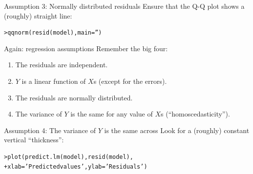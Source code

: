 \documentclass{beamer}\usepackage[]{graphicx}\usepackage[]{color}
\makeatletter
\newcommand{\hlstr}[1]{\textcolor[rgb]{1,0.894,0.71}{#1}}%
\newcommand{\hlstd}[1]{\textcolor[rgb]{1,0.894,0.769}{#1}}%
\newcommand{\hlkwc}[1]{\textcolor[rgb]{0.78,0.941,0.545}{#1}}%
\newcommand{\hlkwd}[1]{\textcolor[rgb]{1,0.78,0.769}{#1}}%
\newenvironment{kframe}{%
 \def\at@end@of@kframe{}%
 \ifinner\ifhmode%
  \def\at@end@of@kframe{\end{minipage}}%
  \begin{minipage}{\columnwidth}%
 \fi\fi%
 \def\FrameCommand##1{\hskip\@totalleftmargin \hskip-\fboxsep
 \colorbox{shadecolor}{##1}\hskip-\fboxsep
     \hskip-\linewidth \hskip-\@totalleftmargin \hskip\columnwidth}%
 \MakeFramed {\advance\hsize-\width
   \@totalleftmargin\z@ \linewidth\hsize
   \@setminipage}}%
 {\par\unskip\endMakeFramed%
 \at@end@of@kframe}
\newenvironment{knitrout}{}{} %
\makeatother
\begin{document}
\begin{darkframes}
    
    
    \begin{frame}[fragile]{Assumption 3: Normally distributed residuals}
      Ensure that the Q-Q plot shows a (roughly) straight line:
\begin{knitrout}
\begin{kframe}
\begin{alltt}
\hlstd{> }\hlkwd{qqnorm}\hlstd{(}\hlkwd{resid}\hlstd{(model),} \hlkwc{main}\hlstd{=}\hlstr{''}\hlstd{)}
\end{alltt}
\end{kframe}


\end{knitrout}
    \end{frame}
    
    
    \begin{frame}{Again: regression assumptions}
    \fontsize{9}{9}\selectfont
      Remember the big four:
      \begin{enumerate}
        \item The residuals are independent.
        \item $Y$ is a linear function of $X$s (except for the errors).
        \item The residuals are normally distributed.
        \item \alert{The variance of $Y$ is the same for any value of $X$s (``homoscedasticity'').}
      \end{enumerate}
    \end{frame}
    
    
    \begin{frame}[fragile]{Assumption 4: The variance of $Y$ is the same across}
      Look for a (roughly) constant vertical ``thickness'':  
\begin{knitrout}
\begin{kframe}
\begin{alltt}
\hlstd{> }\hlkwd{plot}\hlstd{(}\hlkwd{predict.lm}\hlstd{(model),} \hlkwd{resid}\hlstd{(model),}
\hlstd{+ }  \hlkwc{xlab}\hlstd{=}\hlstr{'Predicted values'}\hlstd{,} \hlkwc{ylab}\hlstd{=}\hlstr{'Residuals'}\hlstd{)}
\end{alltt}
\end{kframe}


\end{knitrout}
    \end{frame}
    

\end{darkframes}
\end{document}
